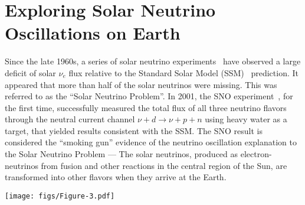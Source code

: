 \documentclass[aps,twocolumn,preprintnumbers,amsmath,superscriptaddress,amssymb,floats,nofootinbib]{revtex4-1}
\begin{document}
\newpage


\twocolumngrid


\section{Exploring Solar Neutrino Oscillations on Earth} 
\label{sec:kamland}

Since the late 1960s, a series of solar neutrino experiments~\cite{Homestake,GALLEX,SAGE,Kamiokande,Super-Kamiokande} have observed a large deficit of solar $\nu_e$ flux relative to the Standard Solar Model (SSM)~\cite{Bahcall} prediction. 
It appeared that more than half of the solar neutrinos were missing. 
This was referred to as the ``Solar Neutrino Problem''. 
In 2001, the SNO experiment~\cite{SNO}, for the first time, successfully measured the total flux of all three neutrino flavors through the neutral current channel $\nu + d \to \nu + p + n$ using heavy water as a target, that yielded 
results consistent with the SSM. 
The SNO result is considered the ``smoking gun'' evidence of the neutrino oscillation explanation to the Solar Neutrino Problem --- The solar neutrinos, produced as electron-neutrinos from fusion and other reactions in the central region of the Sun, are transformed into other flavors when they arrive at the Earth.

\begin{figure*}[htb]
  \centering
  \texttt{[image: figs/Figure-3.pdf]}
  \caption{ \label{fig:kamland}{\bf Results from KamLAND.} (a) The data points show the measured prompt energy spectrum of $\bar\nu_e$ candidate events. The shaded histograms show the expected backgrounds. The expected reactor spectra without oscillation and with best-fit oscillation are shown as the dashed histogram. All histograms incorporate the energy-dependent selection efficiency, which is shown on the top. Only $\sim$60\% of reactor $\bar\nu_e$'s are observed relative to the no-oscillation expectation. 
  (b) The data points show the ratio of the background-subtracted
  $\bar\nu_e$ spectrum to the expectation for no-oscillation as a
  function of $L_{0}/E_{\nu}$. $L_{0}$ is the effective baseline taken as a
  flux-weighted average ($L_{0}$\,=\,180\,km). 
  The spectrum indicates almost two cycles of periodic feature as expected from neutrino oscillations. The oscillation survival probability using the best estimates of $\theta_{12}$ and $|\Delta{m}^2_{21}|$ is given by the blue curve. 
  The curve deviates from the perfect sinusoidal $L/E$ dependence since KamLAND has multiple baselines. Figures are reproduced, with permission, from Ref.~\cite{Kamland08}.
  }
\end{figure*}
\end{document}

